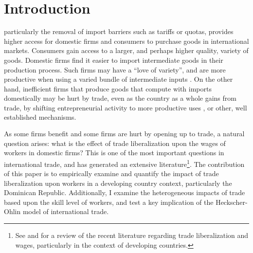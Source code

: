 
\chapter{Introduction}
\label{sec:Introduction}

 particularly the removal of import barriers such as tariffs or quotas, 
provides higher access for domestic firms and consumers to purchase goods in international markets. 
Consumers gain access to a larger, and perhaps higher quality, variety of goods. 
Domestic firms find it easier to import intermediate goods in their production process.
Such firms may have a ``love of variety'', and are more productive when using 
a varied bundle of intermediate inputs \citep{dixit1977monopolistic}. On the other hand, 
inefficient firms that produce goods that compute with imports domestically 
may be hurt by trade, even as the country as a whole gains from trade, by shifting entrepreneurial
activity to more productive uses \citep{holmes2}, or other, well established mechanisms.

As some firms benefit and some firms are hurt by opening up to trade, a natural question arises:
what is the effect of trade liberalization upon the wages of workers in domestic firms?  
This is one of the most important questions in international trade, and has generated
an extensive literature\footnote{See \citet{feenstraglobal} and \citet{goldberg} for a review
of the recent literature regarding trade liberalization and wages, particularly in the context
of developing countries.}. The contribution of this paper 
is to empirically examine and quantify the impact of trade liberalization upon workers in a
developing country context, particularly the Dominican Republic. Additionally, I examine 
the heterogeneous impacts of trade based upon the skill level of workers, and test a key implication of
the Heckscher-Ohlin model of international trade. 

